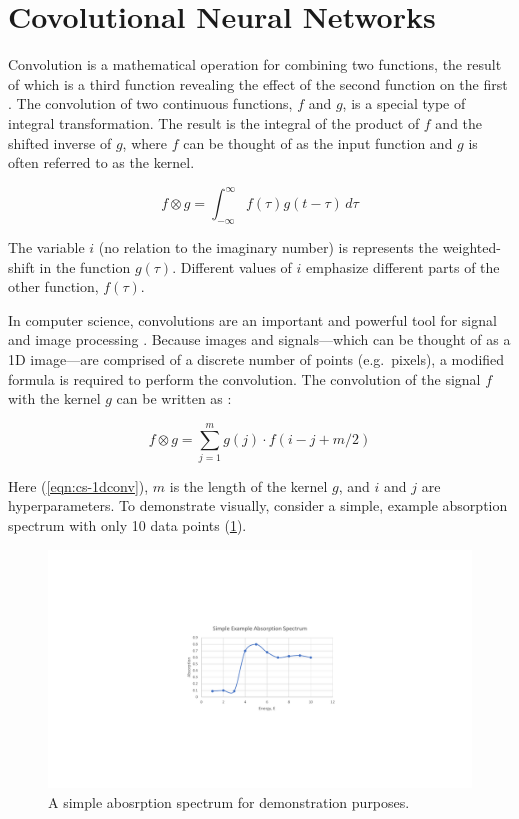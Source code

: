 \section{Covolutional Neural Networks}
Convolution is a mathematical operation for combining two functions, the result of which is a third function revealing the effect of the second function on the first \cite{Boas-mathmethods}. The convolution of two continuous functions, $ f $ and $ g $, is a special type of integral transformation. The result is the integral of the product of $ f $ and the shifted inverse of $ g $, where $ f $ can be thought of as the input function and $ g $ is often referred to as the kernel.

\begin{equation}
    f \otimes g = \int_{-\infty}^{\infty} f(\tau)g(t-\tau) \,d\tau 
\end{equation}

\noindent The variable $ i $ (no relation to the imaginary number) is represents the weighted-shift in the function $ g(\tau) $. Different values of $ i $ emphasize different parts of the other function, $ f(\tau) $.  

In computer science, convolutions are an important and powerful tool for signal and image processing \cite{1dconv-NN-survey} \cite{deepCNNforImages}. Because images and signals---which can be thought of as a 1D image---are comprised of a discrete number of points (e.g.~pixels), a modified formula is required to perform the convolution. The convolution of the signal $ f $ with the kernel $ g $ can be written as \cite{cornell-convs}:

\begin{equation}
    \label{eqn:cs-1dconv}
    f \otimes g = \sum_{j=1}^m g(j) \cdot  f(i-j+m/2)
\end{equation}

\noindent Here (\ref{eqn:cs-1dconv}), $ m $ is the length of the kernel $ g $, and $ i $ and $ j $ are hyperparameters. To demonstrate visually, consider a simple, example absorption spectrum with only 10 data points (\ref{fig:conv-ex-spectrum}).

\begin{figure}[h!]
    \centering
    \includegraphics[width=.75\linewidth]{Chapters/Figures/conv-example.pdf}
    \caption[Toy Absorption Spectrum]{A simple abosrption spectrum for demonstration purposes.}
    \label{fig:conv-ex-spectrum}
\end{figure}
 

